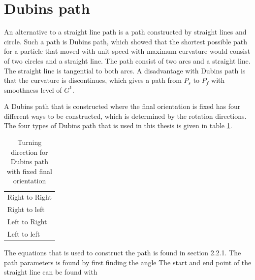 \section{Dubins path}\label{S:DubinsPath}
An alternative to a straight line path is a path constructed by straight lines and circle. Such a path is Dubins path\citep{dubins1957curves}, which showed that the shortest possible path for a particle that moved with unit speed with maximum curvature would consist of two circles and a straight line. The path consist of two arcs and a straight line. The straight line is tangential to both arcs. A disadvantage with Dubins path is that the curvature is discontinues, which gives a path from $P_s$ to $P_f$ with smoothness level of $G^1$.

A Dubins path that is constructed where the final orientation is fixed has four different ways to be constructed, which is determined by the rotation directions. The four types of Dubins path that is used in this thesis is given in table \ref{Tb:DubinsTurningDirection}.
\begin{table}[H]
\centering
\begin{adjustbox}{max width=\textwidth}
\begin{tabular}{ | l |}
\hline
Right to Right \\
Right to left \\
Left to Right \\
Left to left \\ \hline
\end{tabular}
\end{adjustbox}
\caption{Turning direction for Dubins path with fixed final orientation}
\label{Tb:DubinsTurningDirection}
\end{table}
The equations that is used to construct the path is found in \citep{tsourdos2010cooperative} section 2.2.1. The path parameters is found by first finding the angle 
The start and end point of the straight line can be found with

